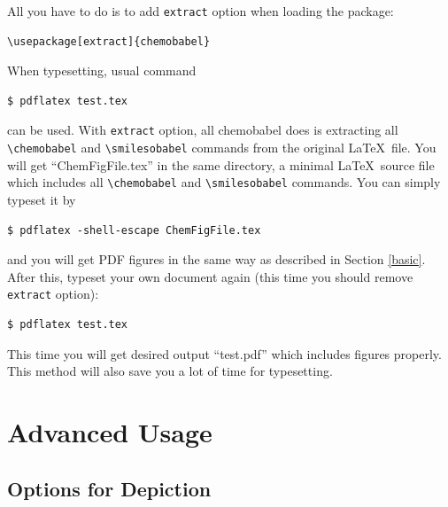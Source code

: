 \documentclass[12pt]{ltjsarticle}
\begin{document}
All you have to do is to add \verb|extract| option when loading the package:
\begin{verbatim}
\usepackage[extract]{chemobabel}
\end{verbatim}
When typesetting, usual command
\begin{verbatim}
$ pdflatex test.tex
\end{verbatim}
can be used.
With \verb|extract| option, all \textsf{chemobabel} does is extracting
all \verb|\chemobabel| and \verb|\smilesobabel| commands from the
original \LaTeX\ file.
You will get ``ChemFigFile.tex'' in the same directory, a minimal
\LaTeX\ source file which includes all \verb|\chemobabel| and
\verb|\smilesobabel| commands.
You can simply typeset it by
\begin{verbatim}
$ pdflatex -shell-escape ChemFigFile.tex
\end{verbatim}
and you will get PDF figures in the same way
as described in Section \ref{basic}.
After this, typeset your own document again
(this time you should remove \verb|extract| option):
\begin{verbatim}
$ pdflatex test.tex
\end{verbatim}
This time you will get desired output ``test.pdf''
which includes figures properly.
This method will also save you a lot of time for typesetting.

\clearpage

\section{Advanced Usage}

\subsection{Options for Depiction}
\label{depict}
\end{document}
